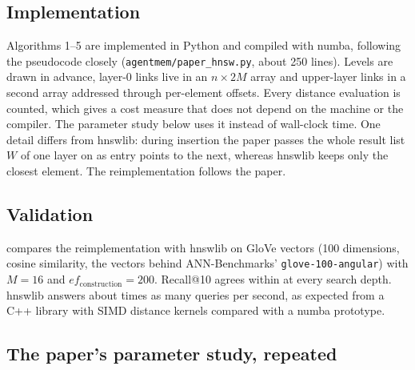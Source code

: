 \documentclass[11pt,a4paper]{article}
\newcommand{\code}[1]{\texttt{#1}}
\begin{document}
\subsection{Implementation}

Algorithms 1--5 are implemented in Python and compiled with numba, following the pseudocode closely (\code{agentmem/paper\_hnsw.py}, about 250 lines). Levels are drawn in advance, layer-0 links live in an $n\times 2M$ array and upper-layer links in a second array addressed through per-element offsets. Every distance evaluation is counted, which gives a cost measure that does not depend on the machine or the compiler. The parameter study below uses it instead of wall-clock time. One detail differs from hnswlib: during insertion the paper passes the whole result list $W$ of one layer on as entry points to the next, whereas hnswlib keeps only the closest element. The reimplementation follows the paper.

\subsection{Validation}

 compares the reimplementation with hnswlib on \HvN{} GloVe vectors (100 dimensions, cosine similarity, the vectors behind ANN-Benchmarks' \code{glove-100-angular}) with $M=16$ and $ef_{\mathrm{construction}}=200$. Recall@10 agrees within \HvMaxDiff{} at every search depth. hnswlib answers about \HvQpsRatio{} times as many queries per second, as expected from a C++ library with SIMD distance kernels compared with a numba prototype.

\begin{table}[t]
\centering\small

\caption{The reimplementation against hnswlib on GloVe-100 (same $M=16$, $ef_{\mathrm{construction}}=200$, 1\,000 queries, one thread).}
\label{tab:validate}
\end{table}

\subsection{The paper's parameter study, repeated}
\end{document}
